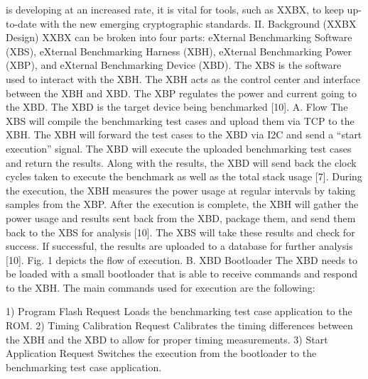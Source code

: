 is developing at an increased rate, it is vital for tools, such as XXBX, to keep up-to-date with the new emerging cryptographic standards.
II. Background (XXBX Design)
XXBX can be broken into four parts: eXternal Benchmarking Software (XBS), eXternal Benchmarking Harness (XBH), eXternal Benchmarking Power (XBP), and eXternal Benchmarking Device (XBD). The XBS is the software used to interact with the XBH. The XBH acts as the control center and interface between the XBH and XBD. The XBP regulates the power and current going to the XBD. The XBD is the target device being benchmarked [10].
A. Flow
The XBS will compile the benchmarking test cases and upload them via TCP to the XBH. The XBH will forward the test cases to the XBD via I2C and send a “start execution” signal. The XBD will execute the uploaded benchmarking test cases and return the results. Along with the results, the XBD will send back the clock cycles taken to execute the benchmark as well as the total stack usage [7].
During the execution, the XBH measures the power usage at regular intervals by taking samples from the XBP. After the execution is complete, the XBH will gather the power usage and results sent back from the XBD, package them, and send them back to the XBS for analysis [10].
The XBS will take these results and check for success. If successful, the results are uploaded to a database for further analysis [10]. Fig. 1 depicts the flow of execution.
B. XBD Bootloader
The XBD needs to be loaded with a small bootloader that is able to receive commands and respond to the XBH. The main commands used for execution are the following:

1) Program Flash Request
Loads the benchmarking test case application to the ROM.
2) Timing Calibration Request
Calibrates the timing differences between the XBH and the XBD to allow for proper timing measurements.
3) Start Application Request
Switches the execution from the bootloader to the benchmarking test case application.


